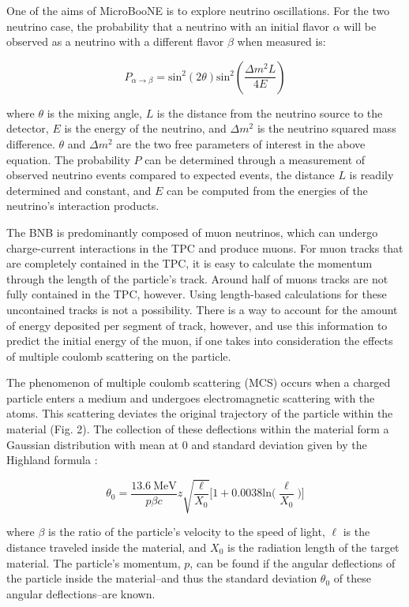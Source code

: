 One of the aims of MicroBooNE is to explore neutrino oscillations. For the two neutrino case, the probability that a neutrino with an initial flavor $\alpha$ will be observed as a neutrino with a different flavor $\beta$ when measured is: 

\begin{equation}
    P_{\alpha \rightarrow \beta}=\text{sin}^2(2\theta)\text{sin}^2(\frac{\Delta m^2 L}{4E})
\end{equation}

\noindent where $\theta$ is the mixing angle, $L$ is the distance from the neutrino source to the detector, $E$ is the energy of the neutrino, and $\Delta m^2$ is the neutrino squared mass difference. $\theta$ and $\Delta m^2$ are the two free parameters of interest in the above equation. The probability $P$ can be determined through a measurement of observed neutrino events compared to expected events, the distance $L$ is readily determined and constant, and $E$ can be computed from the energies of the neutrino's interaction products. 

The BNB is predominantly composed of muon neutrinos, which can undergo charge-current interactions in the TPC and produce muons. For muon tracks that are completely contained in the TPC, it is easy to calculate the momentum through the length of the particle's track. Around half of muons tracks are not fully contained in the TPC, however. Using length-based calculations for these uncontained tracks is not a possibility. There is a way to account for the amount of energy deposited per segment of track, however, and use this information to predict the initial energy of the muon, if one takes into consideration the effects of multiple coulomb scattering on the particle.

The phenomenon of multiple coulomb scattering (MCS) occurs when a charged particle enters a medium and undergoes electromagnetic scattering with the atoms. This scattering deviates the original trajectory of the particle within the material (Fig. 2).  The collection of these deflections within the material form a Gaussian distribution with mean at 0 and standard deviation given by the Highland formula \cite{highland}:  

\begin{equation}
	\theta_0=\frac{13.6\  \text{MeV}}{p\beta c}z\sqrt{\frac{\ell}{X_0}}\Big[1+0.0038\text{ln}\Big(\frac{\ell}{X_0}\Big)\Big]
\end{equation}\label{highland_eqtn}

\noindent where $\beta$ is the ratio of the particle's velocity to the speed of light, $\ell$ is the distance traveled inside the material, and $X_0$ is the radiation length of the target material. The particle's momentum, $p$, can be found if the angular deflections of the particle inside the material--and thus the standard deviation $\theta_0$ of these angular deflections--are known. 

